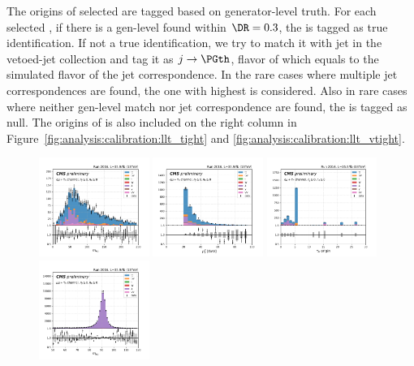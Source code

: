 The origins of selected \PGth are tagged based on generator-level truth. For each selected \PGth, if there is a gen-level \PGth found within $\DR = 0.3$, the \PGth is tagged as true identification.  If not a true identification, we try to match it with jet in the vetoed-jet collection and tag it as $j \to \PGth$, flavor of which equals to the simulated flavor of the jet correspondence.  In the rare cases where multiple jet correspondences are found, the one with highest \pt is considered.  Also in rare cases where neither gen-level \PGth match nor jet correspondence are found, the \PGth is tagged as null. The origins of \PGth is also included on the right column in Figure~\ref{fig:analysis:calibration:llt_tight} and \ref{fig:analysis:calibration:llt_vtight}.
\begin{figure}
    \centering
    \includegraphics[width=0.32\textwidth]{chapters/Analysis/sectionCalibration/figures/jetToTauh/emutau_dilepton_mass_pickles_lltauTight.png}
    \includegraphics[width=0.32\textwidth]{chapters/Analysis/sectionCalibration/figures/jetToTauh/emutau_tauPt_pickles_lltauTight.png}
    \includegraphics[width=0.32\textwidth]{chapters/Analysis/sectionCalibration/figures/jetToTauh/emutau_tauGenFlavor_pickles_lltauTight.png}
    \includegraphics[width=0.32\textwidth]{chapters/Analysis/sectionCalibration/figures/jetToTauh/mumutau_dilepton_mass_pickles_lltauTight.png}

\end{figure}
